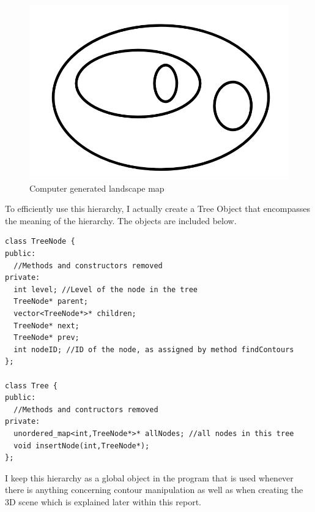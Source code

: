 \documentclass[11pt]{article}
\begin{document}
\begin{figure}
	\includegraphics[scale=0.4]{pics/perfectsimple.png}
	\caption{Computer generated landscape map}
	\label{perfectsimple}
\end{figure}

To efficiently use this hierarchy, I actually create a Tree Object that
encompasses the meaning of the hierarchy. The objects are included below.

\begin{lstlisting}
class TreeNode {
public:
  //Methods and constructors removed
private:
  int level; //Level of the node in the tree
  TreeNode* parent;
  vector<TreeNode*>* children;
  TreeNode* next;
  TreeNode* prev;
  int nodeID; //ID of the node, as assigned by method findContours
};

class Tree {
public:
  //Methods and contructors removed
private:
  unordered_map<int,TreeNode*>* allNodes; //all nodes in this tree
  void insertNode(int,TreeNode*);
};
\end{lstlisting}

I keep this hierarchy as a global object in the program that is used
whenever there is anything concerning contour manipulation as well as when
creating the 3D scene which is explained later within this report.
\end{document}

